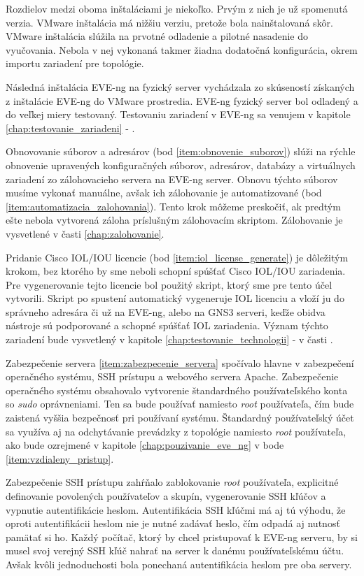 Rozdielov medzi oboma inštaláciami je niekoľko. Prvým z nich je už spomenutá verzia. VMware inštalácia má nižšiu verziu, pretože bola nainštalovaná skôr. VMware inštalácia slúžila na prvotné odladenie a pilotné nasadenie do vyučovania. Nebola v nej vykonaná takmer žiadna dodatočná konfigurácia, okrem importu zariadení pre topológie.

Následná inštalácia EVE-ng na fyzický server vychádzala zo skúseností získaných z inštalácie EVE-ng do VMware prostredia. EVE-ng fyzický server bol odladený a do veľkej miery testovaný. Testovaniu zariadení v EVE-ng sa venujem v kapitole \ref{chap:testovanie_zariadeni} - .

Obnovovanie súborov a adresárov (bod \ref{item:obnovenie_suborov}) slúži na rýchle obnovenie upravených konfiguračných súborov, adresárov, databázy a virtuálnych zariadení zo zálohovacieho servera na EVE-ng server. Obnovu týchto súborov musíme vykonať manuálne, avšak ich zálohovanie je automatizované (bod \ref{item:automatizacia_zalohovania}). Tento krok môžeme preskočiť, ak predtým ešte nebola vytvorená záloha príslušným zálohovacím skriptom. Zálohovanie je vysvetlené v časti \ref{chap:zalohovanie}.

Pridanie Cisco IOL/IOU licencie (bod \ref{item:iol_license_generate}) je dôležitým krokom, bez ktorého by sme neboli schopní spúšťať Cisco IOL/IOU zariadenia. Pre vygenerovanie tejto licencie bol použitý skript, ktorý sme pre tento účel vytvorili. Skript po spustení automatický vygeneruje IOL licenciu a vloží ju do správneho adresára či už na EVE-ng, alebo na GNS3 serveri, keďže obidva nástroje sú podporované a schopné spúšťať IOL zariadenia. Význam týchto zariadení bude vysvetlený v kapitole \ref{chap:testovanie_technologii} -  v časti .

Zabezpečenie servera \ref{item:zabezpecenie_servera} spočívalo hlavne v zabezpečení operačného systému, SSH prístupu a webového servera Apache. Zabezpečenie operačného systému obsahovalo vytvorenie štandardného používateľského konta so \emph{sudo} oprávneniami. Ten sa bude používať namiesto \emph{root} používateľa, čím bude zaistená vyššia bezpečnosť pri používaní systému. Štandardný používateľský účet sa využíva aj na odchytávanie prevádzky z topológie namiesto \emph{root} používateľa, ako bude ozrejmené v kapitole \ref{chap:pouzivanie_eve_ng} v bode \ref{item:vzdialeny_pristup}.

Zabezpečenie SSH prístupu zahŕňalo zablokovanie \emph{root} používateľa, explicitné definovanie povolených používateľov a skupín, vygenerovanie SSH kľúčov a vypnutie autentifikácie heslom. Autentifikácia SSH kľúčmi má aj tú výhodu, že oproti autentifikácii heslom nie je nutné zadávať heslo, čím odpadá aj nutnosť pamätať si ho. Každý počítač, ktorý by chcel pristupovať k EVE-ng serveru, by si musel svoj verejný SSH kľúč nahrať na server k danému používateľskému účtu. Avšak kvôli jednoduchosti bola ponechaná autentifikácia heslom pre oba servery.

